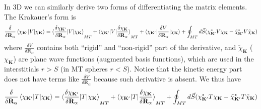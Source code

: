 \documentclass[aps,prb,floatfix,epsfig,singlecolumn,showpacs,preprintnumbers]{revtex4}
\newcommand{\vR}{{\mathbf{R}}}
\newcommand{\vK}{{\mathbf{K}}}
\begin{document}
In 3D we can similarly derive two forms of differentiating the matrix
elements. The Krakauer's form is
\begin{eqnarray}
\frac{\delta}{\delta \vR_\alpha} \braket{\chi_{\vK'}|V|\chi_{\vK}} = 
\braket{\frac{\delta \chi_{\vK'}}{\delta \vR_\alpha} |V|\chi_{\vK}}_{MT}
+\braket{\chi_{\vK'}|V|\frac{\delta \chi_{\vK}}{\delta \vR_\alpha}}_{MT}
+\braket{\chi_{\vK'}|\frac{\delta  V}{\delta \vR_\alpha}|\chi_{\vK}}
+\oint_{MT} d\vec{S}( \chi^*_{\vK'} V \chi_{\vK} - \tilde{\chi}^*_{\vK'} V \tilde{\chi}_{\vK} )
\label{Eq:384}
\end{eqnarray}
where $\frac{\delta  V}{\delta \vR_\alpha}$ contains both ``rigid''
and ``non-rigid'' part of the derivative, and $\tilde{\chi}_\vK$ ($\chi_\vK$) are plane
wave functions (augmented basis functions), which are used in the
interstitials $r>S$ (in MT spheres $r<S$).
Notice that the kinetic energy part does not have terms like
$\frac{\delta  V}{\delta \vR_\alpha}$ because such derivative is
absent. We thus have
\begin{eqnarray}
\frac{\delta}{\delta \vR_\alpha} \braket{\chi_{\vK'}|T|\chi_{\vK}} = 
\braket{\frac{\delta \chi_{\vK'}}{\delta \vR_\alpha} |T|\chi_{\vK}}_{MT}
+\braket{\chi_{\vK'}|T|\frac{\delta \chi_{\vK}}{\delta \vR_\alpha} }_{MT}
+\oint_{MT} d\vec{S}( \chi^*_{\vK'} T \chi_{\vK} - \tilde{\chi}^*_{\vK'} T \tilde{\chi}_{\vK} )
\label{Eq:385}
\end{eqnarray}
\end{document}
